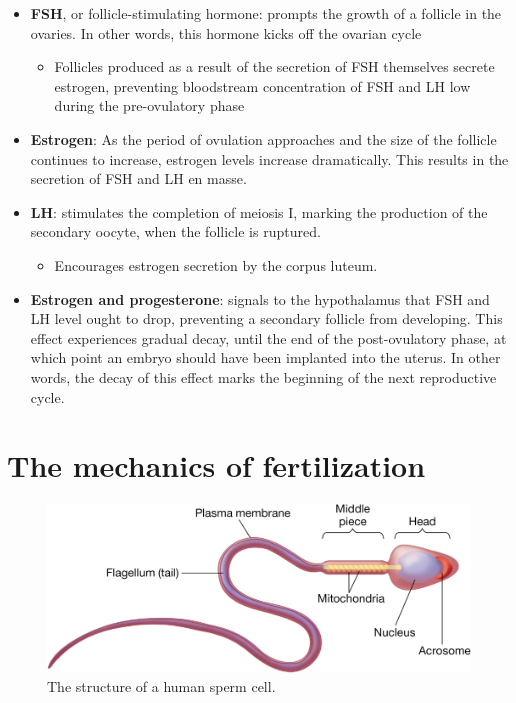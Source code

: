\documentclass{article}
\begin{document}
\begin{itemize}
	\item \textbf{FSH}, or follicle-stimulating hormone: prompts the growth of
		a follicle in the ovaries. In other words, this hormone kicks off the
		ovarian cycle
		\begin{itemize}
			\item Follicles produced as a result of the secretion of FSH
				themselves secrete estrogen, preventing bloodstream
				concentration of FSH and LH low during the pre-ovulatory
				phase
		\end{itemize}
	\item \textbf{Estrogen}: As the period of ovulation approaches and the
		size of the follicle continues to increase, estrogen levels increase
		dramatically. This results in the secretion of FSH and LH en masse.
	\item \textbf{LH}: stimulates the completion of meiosis I, marking the
		production of the secondary oocyte, when the follicle is ruptured.
		\begin{itemize}
			\item Encourages estrogen secretion by the corpus luteum.
		\end{itemize}
	\item \textbf{Estrogen and progesterone}: signals to the hypothalamus that
		FSH and LH level ought to drop, preventing a secondary follicle from
		developing. This effect experiences gradual decay, until the end of
		the post-ovulatory phase, at which point an embryo should have been
		implanted into the uterus. In other words, the decay of this effect
		marks the beginning of the next reproductive cycle.
\end{itemize}

\section{The mechanics of fertilization}

\begin{figure}
	\includegraphics[width=\linewidth]{sperm_cell.png}
	\caption{The structure of a human sperm cell.}
\end{figure}
\end{document}

